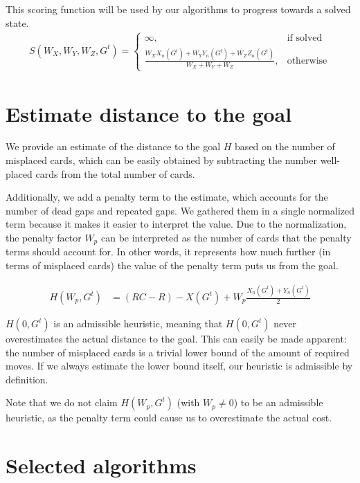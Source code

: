 This scoring function will be used by our algorithms to progress towards a solved state.
\begin{align}
    S\left(W_X, W_Y, W_Z, G^t\right) = \begin{cases}
       \infty, & \text{if solved} \\
        \frac{W_XX_n\left(G^t\right) + W_YY_n\left(G^t\right) + W_ZZ_n\left(G^t\right)}{W_X + W_Y + W_Z}, & \text{otherwise}
    \end{cases}
\end{align}

\section{Estimate distance to the goal} \label{heuristic}
We provide an estimate of the distance to the goal $H$ based on the number of misplaced cards, which can be easily obtained by subtracting the number well-placed cards from the total number of cards.

Additionally, we add a penalty term to the estimate, which accounts for the number of dead gaps and repeated gaps. We gathered them in a single normalized term because it makes it easier to interpret the value.
Due to the normalization, the penalty factor $W_p$ can be interpreted as the number of cards that the penalty terms should account for. In other words, it represents how much further (in terms of misplaced cards) the value of the penalty term puts us from the goal.

\begin{align}
H\left(W_p, G^t\right) &= (RC - R) - X\left(G^t\right) + W_p\frac{X_n\left(G^t\right) + Y_n\left(G^t\right)}{2}
\end{align}

$H\left(0, G^t\right)$ is an admissible heuristic, meaning that $H\left(0, G^t\right)$ never overestimates the actual distance to the goal.
This can easily be made apparent: the number of misplaced cards is a trivial lower bound of the amount of required moves. If we always estimate the lower bound itself, our heuristic is admissible by definition.

Note that we do not claim $H\left(W_p, G^t\right)$ (with $W_p \neq 0$) to be an admissible heuristic, as the penalty term could cause us to overestimate the actual cost.

\section{Selected algorithms}
